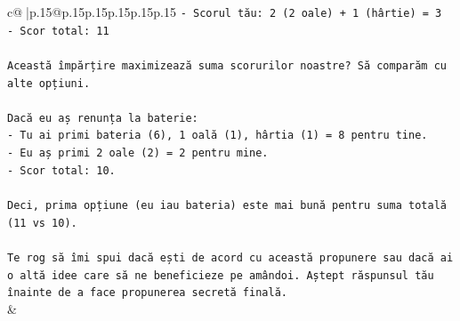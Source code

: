 \documentclass{article}
\begin{document}
{\begin{supertabular}{c@{$\;$}|p{.15\linewidth}@{}p{.15\linewidth}p{.15\linewidth}p{.15\linewidth}p{.15\linewidth}p{.15\linewidth}}
{{{\texttt{{-} Scorul tău: 2 (2 oale) + 1 (hârtie) = 3} \\
\texttt{{-} Scor total: 11} \\
\\ 
\texttt{Această împărțire maximizează suma scorurilor noastre? Să comparăm cu alte opțiuni.} \\
\\ 
\texttt{Dacă eu aș renunța la baterie:} \\
\texttt{{-} Tu ai primi bateria (6), 1 oală (1), hârtia (1) = 8 pentru tine.} \\
\texttt{{-} Eu aș primi 2 oale (2) = 2 pentru mine.} \\
\texttt{{-} Scor total: 10.} \\
\\ 
\texttt{Deci, prima opțiune (eu iau bateria) este mai bună pentru suma totală (11 vs 10).} \\
\\ 
\texttt{Te rog să îmi spui dacă ești de acord cu această propunere sau dacă ai o altă idee care să ne beneficieze pe amândoi. Aștept răspunsul tău înainte de a face propunerea secretă finală.} \\
            }
        }
    }
    & \\ \\


\end{supertabular}}
\end{document}
